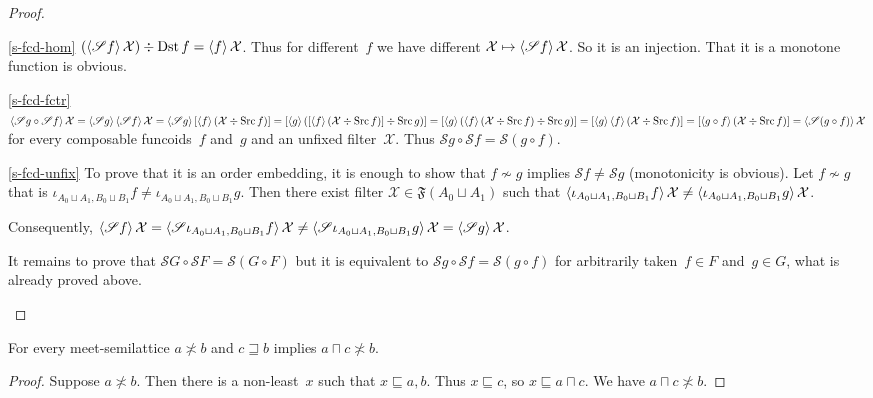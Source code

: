 \begin{proof}
~
\begin{widedisorder}
\item[\ref{s-fcd-hom}]
$(\left\langle \mathscr{S}f\right\rangle\mathcal{X})\div\operatorname{Dst} f=
\left\langle f\right\rangle\mathcal{X}$.
Thus for different~$f$ we have different
$\mathcal{X}\mapsto\left\langle \mathscr{S}f\right\rangle\mathcal{X}$.
So it is an injection. That it is a monotone function
is obvious.

\item[\ref{s-fcd-fctr}]
$\left\langle \mathscr{S}g\circ\mathscr{S}f\right\rangle\mathcal{X}=
\left\langle \mathscr{S}g\right\rangle\left\langle \mathscr{S}f\right\rangle\mathcal{X}=
\left\langle \mathscr{S}g\right\rangle[\left\langle f\right\rangle(\mathcal{X}\div\operatorname{Src} f)]=
[\left\langle g\right\rangle([\left\langle f\right\rangle(\mathcal{X}\div\operatorname{Src} f)]\div\operatorname{Src} g)]=
[\left\langle g\right\rangle(\left\langle f\right\rangle(\mathcal{X}\div\operatorname{Src} f)\div\operatorname{Src} g)]=
[\left\langle g\right\rangle\left\langle f\right\rangle(\mathcal{X}\div\operatorname{Src} f)]=
[\left\langle g\circ f\right\rangle(\mathcal{X}\div\operatorname{Src} f)]=
\left\langle \mathscr{S}(g\circ f)\right\rangle\mathcal{X}$ for every
composable funcoids~$f$ and~$g$ and an unfixed
filter~$\mathcal{X}$. Thus
$\mathscr{S}g\circ\mathscr{S}f=\mathscr{S}(g\circ f)$.

\item[\ref{s-fcd-unfix}]
To prove that it is an order embedding, it is enough to show that $f\nsim g$ implies
$\mathscr{S}f\ne\mathscr{S}g$
(monotonicity is obvious).
Let $f\nsim g$ that is
$\iota_{A_0\sqcup A_1,B_0\sqcup B_1}f\ne
\iota_{A_0\sqcup A_1,B_0\sqcup B_1}g$.
Then there exist filter
$\mathcal{X}\in\mathfrak{F}(A_0\sqcup A_1)$ such that
$\left\langle \iota_{A_0\sqcup A_1,B_0\sqcup B_1}f\right\rangle\mathcal{X}\ne
\left\langle \iota_{A_0\sqcup A_1,B_0\sqcup B_1}g\right\rangle\mathcal{X}$.

Consequently, $\left\langle \mathscr{S}f\right\rangle\mathcal{X}=
\left\langle \mathscr{S}\iota_{A_0\sqcup A_1,B_0\sqcup B_1}f\right\rangle\mathcal{X}\ne
\left\langle \mathscr{S}\iota_{A_0\sqcup A_1,B_0\sqcup B_1}g\right\rangle\mathcal{X}=
\left\langle \mathscr{S}g\right\rangle\mathcal{X}$.

It remains to prove that
$\mathscr{S}G\circ\mathscr{S}F=\mathscr{S}(G\circ F)$
but it is equivalent to 
$\mathscr{S}g\circ\mathscr{S}f=\mathscr{S}(g\circ f)$
for arbitrarily taken~$f\in F$ and~$g\in G$, what
is already proved above.
\end{widedisorder}
\end{proof}

\begin{lem}
For every meet-semilattice $a\nasymp b$ and
$c\sqsupseteq b$ implies $a\sqcap c\nasymp b$.
\end{lem}

\begin{proof}
Suppose $a\nasymp b$. Then there is a non-least~$x$
such that $x\sqsubseteq a,b$. Thus $x\sqsubseteq c$,
so $x\sqsubseteq a\sqcap c$. We have
$a\sqcap c\nasymp b$.
\end{proof}

